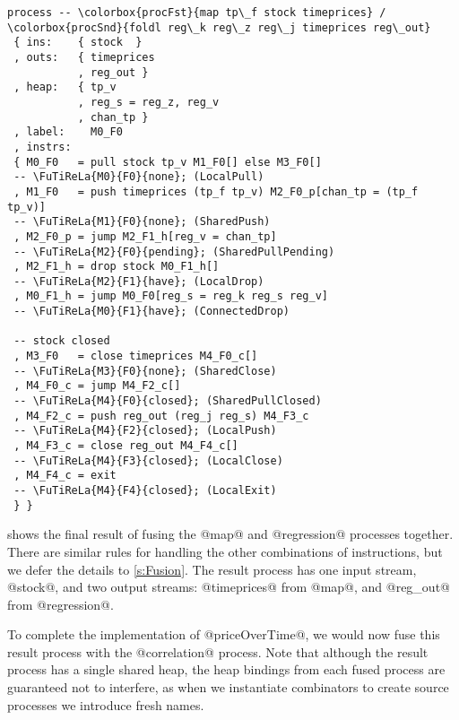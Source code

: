 \begin{lstlisting}[language=process,float,caption={Fusion of \colorbox{procFst}{timeprices} and \colorbox{procSnd}{regression}, along with \colorbox{procCommon}{shared} instructions and variables},label=figs/procs/instance/fused-timeprices-regression,linebackgroundcolor={
  \hilineFst{2}
  \hilineFst{3}
  \hilineSnd{4}
  \hilineFst{5}
  \hilineSnd{6}
  \hilineCom{7}
  \hilineFst{10}
  \hilineFst{11}
  \hilineFst{12}
  \hilineFst{13}
  \hilineSnd{14}
  \hilineSnd{15}
  \hilineFst{16}
  \hilineFst{17}
  \hilineSnd{18}
  \hilineSnd{19}
  \hilineFst{22}
  \hilineFst{23}
  \hilineSnd{24}
  \hilineSnd{25}
  \hilineSnd{26}
  \hilineSnd{27}
  \hilineSnd{28}
  \hilineSnd{29}
  \hilineCom{30}
  \hilineCom{31}
  }]
process -- \colorbox{procFst}{map tp\_f stock timeprices} / \colorbox{procSnd}{foldl reg\_k reg\_z reg\_j timeprices reg\_out}
 { ins:    { stock  }
 , outs:   { timeprices
           , reg_out }
 , heap:   { tp_v
           , reg_s = reg_z, reg_v
           , chan_tp }
 , label:    M0_F0
 , instrs:
 { M0_F0   = pull stock tp_v M1_F0[] else M3_F0[]
 -- \FuTiReLa{M0}{F0}{none}; (LocalPull)
 , M1_F0   = push timeprices (tp_f tp_v) M2_F0_p[chan_tp = (tp_f tp_v)]
 -- \FuTiReLa{M1}{F0}{none}; (SharedPush)
 , M2_F0_p = jump M2_F1_h[reg_v = chan_tp]
 -- \FuTiReLa{M2}{F0}{pending}; (SharedPullPending)
 , M2_F1_h = drop stock M0_F1_h[] 
 -- \FuTiReLa{M2}{F1}{have}; (LocalDrop)
 , M0_F1_h = jump M0_F0[reg_s = reg_k reg_s reg_v]
 -- \FuTiReLa{M0}{F1}{have}; (ConnectedDrop)

 -- stock closed
 , M3_F0   = close timeprices M4_F0_c[] 
 -- \FuTiReLa{M3}{F0}{none}; (SharedClose)
 , M4_F0_c = jump M4_F2_c[] 
 -- \FuTiReLa{M4}{F0}{closed}; (SharedPullClosed)
 , M4_F2_c = push reg_out (reg_j reg_s) M4_F3_c 
 -- \FuTiReLa{M4}{F2}{closed}; (LocalPush)
 , M4_F3_c = close reg_out M4_F4_c[] 
 -- \FuTiReLa{M4}{F3}{closed}; (LocalClose)
 , M4_F4_c = exit
 -- \FuTiReLa{M4}{F4}{closed}; (LocalExit)
 } }
\end{lstlisting}

 shows the final result of fusing the @map@ and @regression@ processes together.
There are similar rules for handling the other combinations of instructions, but we defer the details to \cref{s:Fusion}.
The result process has one input stream, @stock@, and two output streams: @timeprices@ from @map@, and @reg_out@ from @regression@.

To complete the implementation of @priceOverTime@, we would now fuse this result process with the @correlation@ process.
Note that although the result process has a single shared heap, the heap bindings from each fused process are guaranteed not to interfere, as when we instantiate combinators to create source processes we introduce fresh names. 


